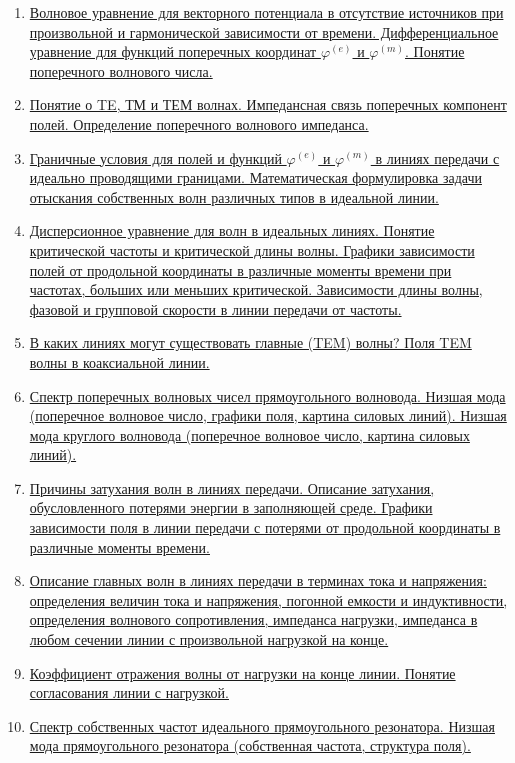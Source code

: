 \documentclass[a4paper,14pt]{extarticle}
\renewcommand{\phi}{\varphi}
\begin{document}
\begin{enumerate}
		\item 
		\hyperlink{num2}{Волновое уравнение для векторного потенциала в отсутствие источников при произвольной и гармонической зависимости от времени. Дифференциальное уравнение для функций поперечных координат $\phi^{(e)}$ и $\phi^{(m)}$. Понятие поперечного волнового числа.}
		\item 
		\hyperlink{num3}{Понятие о TE, ТМ и ТЕМ волнах. Импедансная связь поперечных компонент полей. Определение поперечного волнового импеданса.}
		\item
		\hyperlink{num4}{Граничные условия для полей и функций  $\phi^{(e)}$ и $\phi^{(m)}$ в линиях передачи с идеально 
		проводящими границами. Математическая формулировка задачи отыскания собственных волн различных типов в идеальной линии.}
		\item 
		\hyperlink{num5}{Дисперсионное уравнение для волн в идеальных линиях. Понятие критической частоты и критической длины волны. Графики зависимости полей от продольной координаты в различные моменты времени при частотах, больших или меньших критической. Зависимости длины волны, фазовой и групповой скорости в линии передачи от частоты.}
		\item
		\hyperlink{num6}{В каких линиях могут существовать главные (TEM) волны? Поля TEM волны в	коаксиальной линии.}
		\item 
		\hyperlink{num7}{Спектр поперечных волновых чисел прямоугольного волновода. Низшая мода (поперечное волновое число, графики поля, картина силовых линий). Низшая мода круглого волновода (поперечное волновое число, картина силовых линий).}
		\item
		\hyperlink{num8}{Причины затухания волн в линиях передачи. Описание затухания, обусловленного потерями энергии в заполняющей среде. Графики зависимости поля в линии передачи с потерями от продольной координаты в различные моменты времени.}
		\item
		\hyperlink{num9}{Описание главных волн в линиях передачи в терминах тока и напряжения: определения величин тока и напряжения, погонной емкости и индуктивности, \underline{определения} волнового сопротивления, импеданса нагрузки, импеданса в любом сечении линии с произвольной нагрузкой на конце.}
		\item 
		\hyperlink{num10}{Коэффициент отражения волны от нагрузки на конце линии. Понятие согласования линии с нагрузкой.}
		\item 
		\hyperlink{num11}{Спектр собственных частот идеального прямоугольного резонатора. Низшая мода прямоугольного резонатора (собственная частота, структура поля).}

\end{enumerate}
\end{document}
